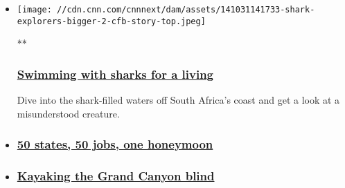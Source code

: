 \begin{itemize}
\item
  \href{/videos/world/2014/10/29/wish-you-were-here-shark-diver-south-africa-orig-cfb.cnn}{}

  \texttt{[image: //cdn.cnn.com/cnnnext/dam/assets/141031141733-shark-explorers-bigger-2-cfb-story-top.jpeg]}

  **

  \hypertarget{swimming-with-sharks-for-a-living-}{%
  \subsubsection{\texorpdfstring{\href{/videos/world/2014/10/29/wish-you-were-here-shark-diver-south-africa-orig-cfb.cnn}{Swimming
  with sharks for a living
  }}{Swimming with sharks for a living }}\label{swimming-with-sharks-for-a-living-}}

  Dive into the shark-filled waters off South Africa's coast and get a
  look at a misunderstood creature.
\item
  \hypertarget{50-states-50-jobs-one-honeymoon}{%
  \subsubsection{\texorpdfstring{\href{/videos/us/2014/10/29/wish-you-were-here-padgett-rv-across-america-honeymoon-orig-cfb.cnn}{50
  states, 50 jobs, one
  honeymoon}}{50 states, 50 jobs, one honeymoon}}\label{50-states-50-jobs-one-honeymoon}}
\item
  \hypertarget{kayaking-the-grand-canyon-blind}{%
  \subsubsection{\texorpdfstring{\href{/videos/us/2014/10/30/wish-you-were-here-blind-kayak-grand-canyon-orig-cfb.cnn}{Kayaking
  the Grand Canyon
  blind}}{Kayaking the Grand Canyon blind}}\label{kayaking-the-grand-canyon-blind}}
\end{itemize}

